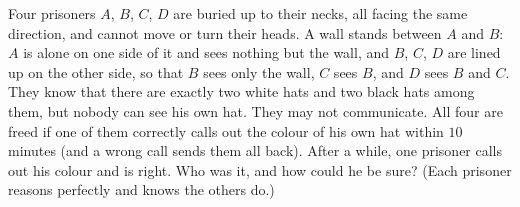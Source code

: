 Four prisoners $A$, $B$, $C$, $D$ are buried up to their necks, all facing the same direction, and cannot move or turn their heads. A wall stands between $A$ and $B$: $A$ is alone on one side of it and sees nothing but the wall, and $B$, $C$, $D$ are lined up on the other side, so that $B$ sees only the wall, $C$ sees $B$, and $D$ sees $B$ and $C$. They know that there are exactly two white hats and two black hats among them, but nobody can see his own hat. They may not communicate. All four are freed if one of them correctly calls out the colour of his own hat within $10$ minutes (and a wrong call sends them all back). After a while, one prisoner calls out his colour and is right. Who was it, and how could he be sure? (Each prisoner reasons perfectly and knows the others do.)
